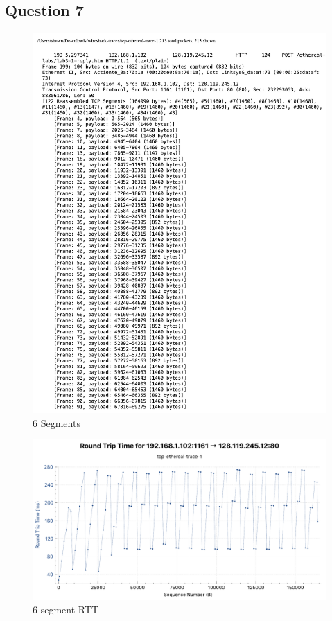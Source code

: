 \documentclass[titlepage, paper=a4, fontsize=11pt]{scrartcl} %
\numberwithin{equation}{section} %
\numberwithin{figure}{section} %
\numberwithin{table}{section} %
\begin{document}
\subsection*{Question 7}
\begin{figure}[!ht]
    \centering
    \includegraphics[width=\textwidth]{images/lab1-q7.pdf}
    \caption{6 Segments}
    \label{fig:6seg}
\end{figure}
\begin{figure}[!ht]
    \centering
    \includegraphics[width=\textwidth]{images/lab1-q7-2.pdf}
    \caption{6-segment RTT}
    \label{fig:6seg-rtt}
\end{figure}
\end{document}
